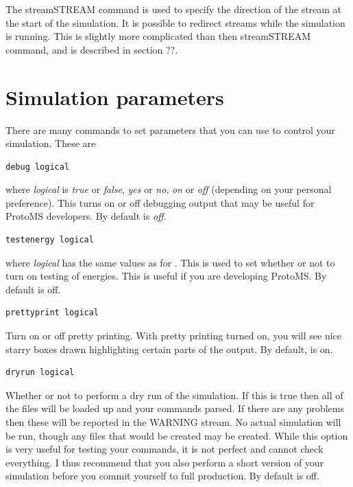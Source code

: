 \documentclass[letterpaper,10pt,english]{sphinxmanual}
\begin{document}
The streamSTREAM command is used to specify the direction of the stream at the start of the simulation. It is possible to redirect streams while the simulation is running. This is slightly more complicated than then streamSTREAM command, and is described in section ??.


\section{Simulation parameters}
\label{protoms:simulation-parameters}
There are many commands to set parameters that you can use to control your simulation. These are

\begin{Verbatim}[commandchars=\\\{\}]
debug logical
\end{Verbatim}

where \emph{logical} is \emph{true} or \emph{false}, \emph{yes} or \emph{no}, \emph{on} or \emph{off} (depending on your personal preference). This turns
on or off debugging output that may be useful for ProtoMS developers. By default  is \emph{off}.

\begin{Verbatim}[commandchars=\\\{\}]
testenergy logical
\end{Verbatim}

where \emph{logical} has the same values as for . This is used to set whether or not to turn on testing of energies. This is useful if you are developing ProtoMS. By default  is off.

\begin{Verbatim}[commandchars=\\\{\}]
prettyprint logical
\end{Verbatim}

Turn on or off pretty printing. With pretty printing turned on, you will see nice starry boxes drawn highlighting certain parts of the output. By default,  is on.

\begin{Verbatim}[commandchars=\\\{\}]
dryrun logical
\end{Verbatim}

Whether or not to perform a dry run of the simulation. If this is true then all of the files will be loaded up and your commands parsed. If there are any problems then these will be reported in the WARNING stream. No actual simulation will be run, though any files that would be created may be created. While this option is very useful for testing your commands, it is not perfect and cannot check everything. I thus recommend that you also perform a short version of your simulation before you commit yourself to full production. By default  is off.
\end{document}
